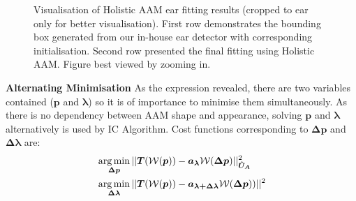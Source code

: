 \begin{figure}
    
    \caption{Visualisation of Holistic AAM ear fitting results (cropped to ear only for better visualisation). First row demonstrates the bounding box generated from our in-house ear detector with corresponding initialisation. Second row presented the final fitting using Holistic AAM. Figure best viewed by zooming in.}
    \label{fig:fitting_visualise}
\end{figure}


\noindent\textbf{Alternating Minimisation}
As the expression revealed, there are two variables contained ($\bm{p}$ and $\bm{\lambda}$) so it is of importance to minimise them simultaneously. As there is no dependency between AAM shape and appearance, solving $\bm{p}$ and $\bm{\lambda}$ alternatively is used by IC Algorithm. Cost functions corresponding to $\bm{\Delta p}$ and $\bm{\Delta \lambda}$ are:
\begin{align}
    \label{eq:aamfittingappearancevariance_ear}
    & \operatorname*{arg\,min}_{\bm{\Delta p}}||\bm{T}(\mathcal{W}(\bm{p}))-\bm{a_\lambda}\mathcal{W}(\bm{\Delta p})||^2_{\bm{\hat{U}_A}} \\
    & \operatorname*{arg\,min}_{\bm{\Delta\lambda}}||\bm{T}(\mathcal{W}(\bm{p}))-\bm{a_{\lambda+\Delta \lambda}}{\mathcal{W}({\bm{\Delta p}})})||^2
\end{align}

